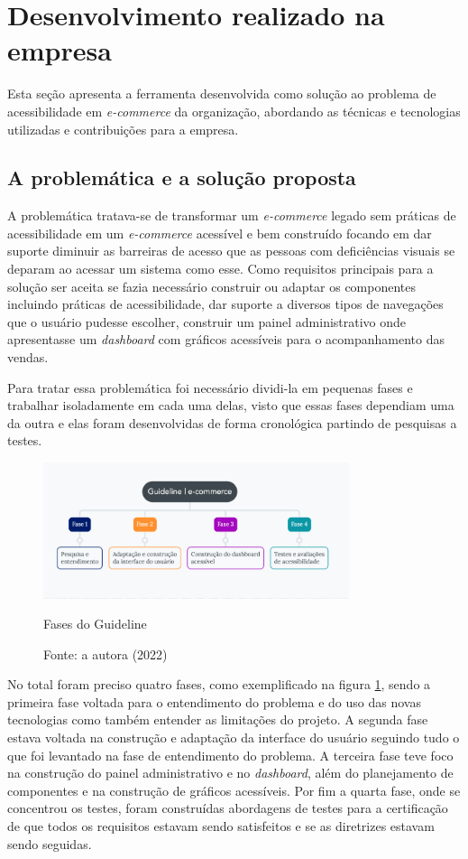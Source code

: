 \section{Desenvolvimento realizado na empresa}
\label{sec:desenvolvimento}

{Esta seção apresenta a ferramenta desenvolvida como solução ao problema de acessibilidade em  \textit{e-commerce} da organização, abordando as técnicas e tecnologias utilizadas e contribuições para a empresa.}

\subsection{A problemática e a solução proposta}

{A problemática tratava-se de transformar um \textit{e-commerce} legado sem práticas de acessibilidade em um \textit{e-commerce} acessível e bem construído focando em dar suporte diminuir as barreiras de acesso que as pessoas com deficiências visuais se deparam ao acessar um sistema como esse. Como requisitos principais para a solução ser aceita se fazia necessário construir ou adaptar os componentes incluindo práticas de acessibilidade, dar suporte a diversos tipos de navegações que o usuário pudesse escolher, construir um painel administrativo onde apresentasse um \textit{dashboard} com gráficos acessíveis para o acompanhamento das vendas.

Para tratar essa problemática foi necessário dividi-la em pequenas fases e trabalhar isoladamente em cada uma delas, visto que essas fases dependiam uma da outra e elas foram desenvolvidas de forma cronológica partindo de pesquisas a testes. 

\begin{figure}[ht]
  	\centering
    \includegraphics[width=0.8\textwidth]{images/guideline-4.png}
    \caption{Fases do Guideline}
    \caption*{Fonte: a autora (2022)}
    \label{fig:guideline}
\end{figure}  

No total foram preciso quatro fases, como exemplificado na figura  \ref{fig:guideline}, sendo a primeira fase voltada para o entendimento do problema e do uso das novas tecnologias como também entender as limitações do projeto. A segunda fase estava voltada na construção e adaptação da interface do usuário seguindo tudo o que foi levantado na fase de entendimento do problema. A terceira fase teve foco na construção do painel administrativo e no \textit{dashboard}, além do planejamento de componentes e na construção de gráficos acessíveis. Por fim a quarta fase, onde se concentrou os testes, foram construídas abordagens de testes para a certificação de que todos os requisitos estavam sendo satisfeitos e se as diretrizes estavam sendo seguidas.

}
